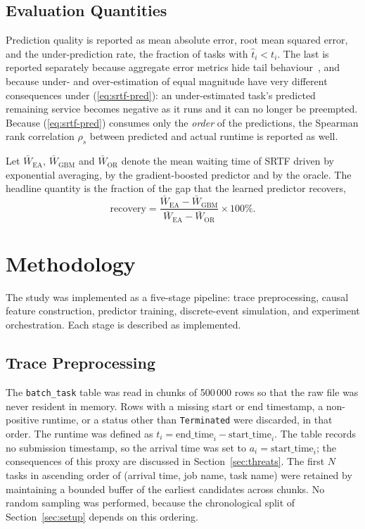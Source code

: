 \documentclass[conference]{IEEEtran}
\begin{document}
\subsection{Evaluation Quantities}
Prediction quality is reported as mean absolute error, root mean squared
error, and the under-prediction rate, the fraction of tasks with
$\hat{t}_i < t_i$. The last is reported separately because aggregate error
metrics hide tail behaviour~\cite{xiao_tare_2026}, and because under- and
over-estimation of equal magnitude have very different consequences under
(\ref{eq:srtf-pred}): an under-estimated task's predicted remaining service
becomes negative as it runs and it can no longer be preempted. Because
(\ref{eq:srtf-pred}) consumes only the \emph{order} of the predictions,
the Spearman rank correlation $\rho_s$ between predicted and actual runtime
is reported as well.

Let $\bar{W}_{\mathrm{EA}}$, $\bar{W}_{\mathrm{GBM}}$ and
$\bar{W}_{\mathrm{OR}}$ denote the mean waiting time of SRTF driven by
exponential averaging, by the gradient-boosted predictor and by the oracle.
The headline quantity is the fraction of the gap that the learned predictor
recovers,
\begin{equation}
  \mathrm{recovery} =
  \frac{\bar{W}_{\mathrm{EA}} - \bar{W}_{\mathrm{GBM}}}
       {\bar{W}_{\mathrm{EA}} - \bar{W}_{\mathrm{OR}}} \times 100\% .
  \label{eq:recovery}
\end{equation}

\section{Methodology}
\label{sec:method}

The study was implemented as a five-stage pipeline: trace preprocessing,
causal feature construction, predictor training, discrete-event simulation,
and experiment orchestration. Each stage is described as implemented.

\subsection{Trace Preprocessing}
The \texttt{batch\_task} table was read in chunks of 500\,000 rows so that
the raw file was never resident in memory. Rows with a missing start or end
timestamp, a non-positive runtime, or a status other than
\texttt{Terminated} were discarded, in that order. The runtime was defined as
$t_i = \mathrm{end\_time}_i - \mathrm{start\_time}_i$. The table records no
submission timestamp, so the arrival time was set to
$a_i = \mathrm{start\_time}_i$; the consequences of this proxy are discussed
in Section~\ref{sec:threats}. The first $N$ tasks in ascending order of
(arrival time, job name, task name) were retained by maintaining a bounded
buffer of the earliest candidates across chunks. No random sampling was
performed, because the chronological split of Section~\ref{sec:setup}
depends on this ordering.
\end{document}
